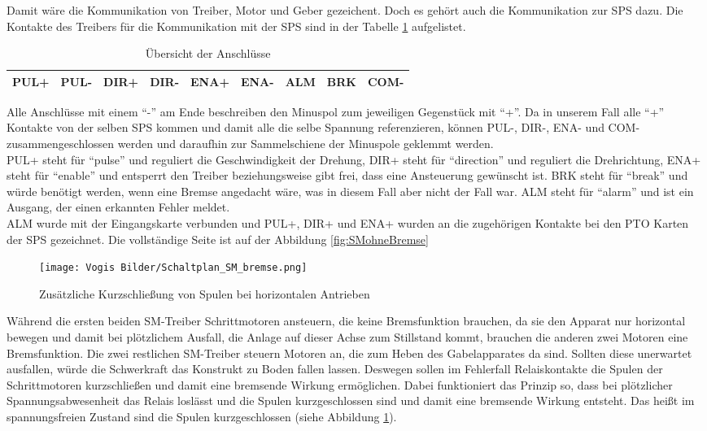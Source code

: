     Damit wäre die Kommunikation von Treiber, Motor und Geber gezeichent. Doch es gehört auch die Kommunikation zur SPS dazu. Die Kontakte des Treibers für die Kommunikation mit der SPS sind in der Tabelle \ref{tab:anschluesse} aufgelistet.\\ 
    \begin{table}[H]
        \centering
        \begin{tabular}{|c|c|c|c|c|c|c|c|c|}
            \hline
            \textbf{PUL+} & \textbf{PUL-} & \textbf{DIR+} & \textbf{DIR-} & \textbf{ENA+} & \textbf{ENA-} & \textbf{ALM} & \textbf{BRK} & \textbf{COM-} \\ \hline
        \end{tabular}
        \caption{Übersicht der Anschlüsse}
        \label{tab:anschluesse}
    \end{table}
    Alle Anschlüsse mit einem \enquote{-} am Ende beschreiben den Minuspol zum jeweiligen Gegenstück mit \enquote{+}. Da in unserem Fall alle \enquote{+} Kontakte von der selben SPS kommen und damit alle die selbe Spannung referenzieren, können PUL-, DIR-, ENA- und COM- zusammengeschlossen werden und daraufhin zur Sammelschiene der Minuspole geklemmt werden.\\
    PUL+ steht für \enquote{pulse} und reguliert die Geschwindigkeit der Drehung,  DIR+ steht für \enquote{direction} und reguliert die Drehrichtung, ENA+ steht für \enquote{enable} und entsperrt den Treiber beziehungsweise gibt frei, dass eine Ansteuerung gewünscht ist. BRK steht für \enquote{break} und würde benötigt werden, wenn eine Bremse angedacht wäre, was in diesem Fall aber nicht der Fall war. ALM steht für \enquote{alarm} und ist ein Ausgang, der einen erkannten Fehler meldet.\\
    ALM wurde mit der Eingangskarte verbunden und PUL+, DIR+ und ENA+ wurden an die zugehörigen Kontakte bei den PTO Karten der SPS gezeichnet. Die vollständige Seite ist auf der Abbildung \ref{fig:SMohneBremse}\\     
    \begin{figure}[h]
        \centering
        \texttt{[image: Vogis Bilder/Schaltplan\_SM\_bremse.png]}
        \caption{Zusätzliche Kurzschließung von Spulen bei horizontalen Antrieben}
        \label{fig:SMmitBremse}
    \end{figure}
    Während die ersten beiden SM-Treiber Schrittmotoren ansteuern, die keine Bremsfunktion brauchen, da sie den Apparat nur horizontal bewegen und damit bei plötzlichem Ausfall, die Anlage auf dieser Achse zum Stillstand kommt, brauchen die anderen zwei Motoren eine Bremsfunktion. Die zwei restlichen SM-Treiber steuern Motoren an, die zum Heben des Gabelapparates da sind. Sollten diese unerwartet ausfallen, würde die Schwerkraft das Konstrukt zu Boden fallen lassen. Deswegen sollen im Fehlerfall Relaiskontakte die Spulen der Schrittmotoren kurzschließen und damit eine bremsende Wirkung ermöglichen. Dabei funktioniert das Prinzip so, dass bei plötzlicher Spannungsabwesenheit das Relais loslässt und die Spulen kurzgeschlossen sind und damit eine bremsende Wirkung entsteht. Das heißt im spannungsfreien Zustand sind die Spulen kurzgeschlossen (siehe Abbildung \ref{fig:SMmitBremse}).
